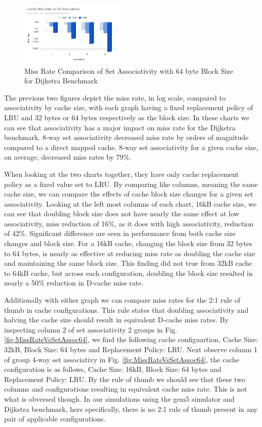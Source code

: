 \documentclass[conference]{IEEEtran}
\begin{document}
\begin{figure}[H]
    \centering
    \includegraphics[width=0.45\textwidth]{dijkstraFigures/CacheMissRatevsSetAssociativity64.png}
    \caption{Miss Rate Comparison of Set Associativity with 64 byte Block Size for Dijkstra Benchmark}
    \label{fig:MissRateVsAssoc64}
  \end{figure}
    
The previous two figures depict the miss rate, in log scale, compared to associativity by cache size, with each graph having a fixed replacement policy of LRU and 32 bytes or 64 bytes respectively as the block size. In these charts we can see that associativity has a major impact on miss rate for the Dijkstra benchmark. 8-way set associativity decreased miss rate by orders of magnitude compared to a direct mapped cache. 8-way set associativity for a given cache size, on average, decreased miss rates by 79\%.

When looking at the two charts together, they have only cache replacement policy as a fixed value set to LRU. By comparing like columns, meaning the same cache size, we can compare the effects of cache block size changes for a given set associativity. Looking at the left most columns of each chart, 16kB cache size, we can see that doubling block size does not have nearly the same effect at low associativity, miss reduction of 16\%, as it does with high associativity, reduction of 42\%. Significant difference are seen in performance from both cache size changes and block size. For a 16kB cache, changing the block size from 32 bytes to 64 bytes, is nearly as effective at reducing miss rate as doubling the cache size and maintaining the same block size. This finding did not true from 32kB cache to 64kB cache, but across each configuration, doubling the block size resulted in nearly a 50\% reduction in D-cache miss rate.

Additionally with either graph we can compare miss rates for the 2:1 rule of thumb in cache configurations. This rule states that doubling associativity and halving the cache size should result in equivalent D-cache miss rates. By inspecting column 2 of set associativity 2 groups in Fig. \ref{fig:MissRateVsSetAssoc64}, we find the following cache configuartion, Cache Size: 32kB, Block Size: 64 bytes and Replacement Policy: LRU. Next observe column 1 of group 4-way set associativy in Fig. \ref{fig:MissRateVsSetAssoc64}, the cache configuration is as follows, Cache Size: 16kB, Block Size: 64 bytes and Replacement Policy: LRU. By the rule of thumb we should see that these two columns and configurations resulting in equivalent cache miss rate. This is not what is obversed though. In our simulations using the gem5 simulator and Dijkstra benchmark, here specifically, there is no 2:1 rule of thumb present in any pair of applicable configurations.
\end{document}
